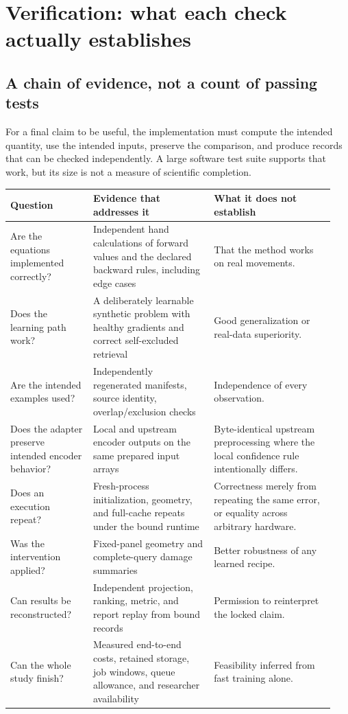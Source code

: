 \clearpage
\section{Verification: what each check actually establishes}\label{sec:verification}
\subsection{A chain of evidence, not a count of passing tests}
For a final claim to be useful, the implementation must compute the intended
quantity, use the intended inputs, preserve the comparison, and produce records
that can be checked independently. A large software test suite supports that
work, but its size is not a measure of scientific completion.

\begin{longtable}{@{}P{0.24\linewidth}P{0.35\linewidth}P{0.35\linewidth}@{}}
\toprule Question & Evidence that addresses it & What it does not establish\\\midrule\endhead
Are the equations implemented correctly? & Independent hand calculations of
forward values and the declared backward rules, including edge cases & That the
method works on real movements.\\\addlinespace
Does the learning path work? & A deliberately learnable synthetic problem with
healthy gradients and correct self-excluded retrieval & Good generalization or
real-data superiority.\\\addlinespace
Are the intended examples used? & Independently regenerated manifests, source
identity, overlap/exclusion checks & Independence of every observation.\\\addlinespace
Does the adapter preserve intended encoder behavior? & Local and upstream
encoder outputs on the same prepared input arrays & Byte-identical upstream
preprocessing where the local confidence rule intentionally differs.\\\addlinespace
Does an execution repeat? & Fresh-process initialization, geometry, and full-cache
repeats under the bound runtime & Correctness merely from repeating the same
error, or equality across arbitrary hardware.\\\addlinespace
Was the intervention applied? & Fixed-panel geometry and complete-query damage
summaries & Better robustness of any learned recipe.\\\addlinespace
Can results be reconstructed? & Independent projection, ranking, metric, and
report replay from bound records & Permission to reinterpret the locked claim.\\\addlinespace
Can the whole study finish? & Measured end-to-end costs, retained storage, job
windows, queue allowance, and researcher availability & Feasibility inferred
from fast training alone.\\\bottomrule
\end{longtable}


